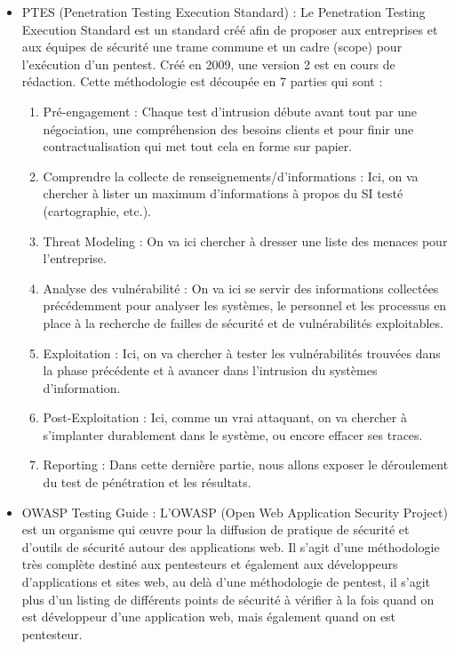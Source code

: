 \documentclass[a4paper]{memoir}
\begin{document}
\begin{itemize}
\item PTES (Penetration Testing Execution Standard) : Le Penetration Testing Execution Standard est un standard créé afin de proposer aux entreprises et aux équipes de sécurité une trame commune et un cadre (scope) pour l’exécution d’un pentest. Créé en 2009, une version 2 est en cours de rédaction. 
Cette méthodologie est découpée en 7 parties qui sont :

	\begin{enumerate}	
		\item Pré-engagement : Chaque test d’intrusion débute avant tout par une négociation, une compréhension des besoins clients et pour finir une contractualisation qui met tout cela en forme sur papier.
		\item Comprendre la collecte de renseignements/d’informations : Ici, on va chercher à lister un maximum d’informations à propos du SI testé (cartographie, etc.).
		\item Threat Modeling : On va ici chercher à dresser une liste des menaces pour l’entreprise.
		\item Analyse des vulnérabilité : On va ici se servir des informations collectées précédemment pour analyser les systèmes, le personnel et les processus en place à la recherche de failles de sécurité et de vulnérabilités exploitables.
		\item Exploitation : Ici, on va chercher à tester les vulnérabilités trouvées dans la phase précédente et à avancer dans l’intrusion du systèmes d’information.
		\item Post-Exploitation : Ici, comme un vrai attaquant, on va chercher à s'implanter durablement dans le système, ou encore effacer ses traces.
		\item Reporting : Dans cette dernière partie, nous allons exposer le déroulement du test de pénétration et les résultats. \\
	\end{enumerate}

\item OWASP Testing Guide : L’OWASP (Open Web Application Security Project) est un organisme qui œuvre pour la diffusion de pratique de sécurité et d’outils de sécurité autour des applications web.  Il s’agit d’une méthodologie très complète destiné aux pentesteurs et également aux développeurs d’applications et sites web, au delà d’une méthodologie de pentest, il s’agit plus d’un listing de différents points de sécurité à vérifier à la fois quand on est développeur d’une application web, mais également quand on est pentesteur.\\


\end{itemize}
\end{document}
